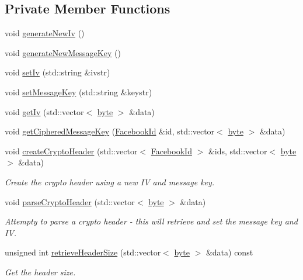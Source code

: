 \subsection*{Private Member Functions}
\begin{DoxyCompactItemize}
\item 
void \hyperlink{classefb_1_1BotanCrypto_adb7dda4b7a25248c0a2ef2304f963799}{generateNewIv} ()
\item 
void \hyperlink{classefb_1_1BotanCrypto_a6dfd64b465fd521ebad9db4cad7ab2b7}{generateNewMessageKey} ()
\item 
void \hyperlink{classefb_1_1BotanCrypto_a157ac4e58784b83f91ff8cc8ad0e3707}{setIv} (std::string \&ivstr)
\item 
void \hyperlink{classefb_1_1BotanCrypto_a432078e20f50920790d0a36d74a6db39}{setMessageKey} (std::string \&keystr)
\item 
void \hyperlink{classefb_1_1BotanCrypto_a1eadc5a54ba4734a94ade3a8a1196161}{getIv} (std::vector$<$ \hyperlink{namespaceefb_a0c8186d9b9b7880309c27230bbb5e69d}{byte} $>$ \&data)
\item 
void \hyperlink{classefb_1_1BotanCrypto_a62b318991e2c89cf7ccadbb9b9be5899}{getCipheredMessageKey} (\hyperlink{structefb_1_1FacebookId}{FacebookId} \&id, std::vector$<$ \hyperlink{namespaceefb_a0c8186d9b9b7880309c27230bbb5e69d}{byte} $>$ \&data)
\item 
void \hyperlink{classefb_1_1BotanCrypto_a77d2e662a29f4002bd2fb5fda7ec1753}{createCryptoHeader} (std::vector$<$ \hyperlink{structefb_1_1FacebookId}{FacebookId} $>$ \&ids, std::vector$<$ \hyperlink{namespaceefb_a0c8186d9b9b7880309c27230bbb5e69d}{byte} $>$ \&data)
\begin{DoxyCompactList}\small\item\em Create the crypto header using a new IV and message key. \item\end{DoxyCompactList}\item 
void \hyperlink{classefb_1_1BotanCrypto_af19ddf3f04af1a9bdc9ade40b259d75c}{parseCryptoHeader} (std::vector$<$ \hyperlink{namespaceefb_a0c8186d9b9b7880309c27230bbb5e69d}{byte} $>$ \&data)
\begin{DoxyCompactList}\small\item\em Attempty to parse a crypto header -\/ this will retrieve and set the message key and IV. \item\end{DoxyCompactList}\item 
unsigned int \hyperlink{classefb_1_1BotanCrypto_aeea9d6426438fd56e7ef699e9189993a}{retrieveHeaderSize} (std::vector$<$ \hyperlink{namespaceefb_a0c8186d9b9b7880309c27230bbb5e69d}{byte} $>$ \&data) const 
\begin{DoxyCompactList}\small\item\em Get the header size. \item\end{DoxyCompactList}\end{DoxyCompactItemize}
